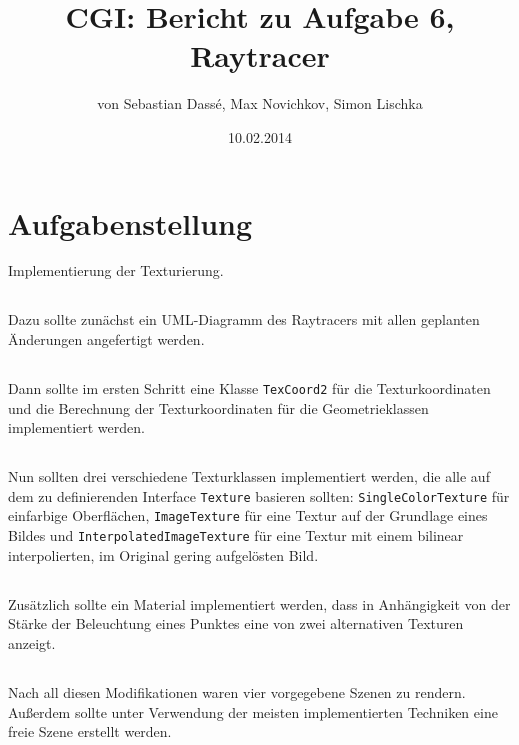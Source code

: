 \documentclass[11pt]{amsart}
\title{CGI: Bericht zu Aufgabe 6, Raytracer}
\author{von Sebastian Dass\'{e}, Max Novichkov, Simon Lischka }
\date{10.02.2014}
\begin{document}
\maketitle

\section{Aufgabenstellung}
Implementierung der Texturierung.

\subsection{}
Dazu sollte zun\"achst ein UML-Diagramm des Raytracers mit allen geplanten \"Anderungen angefertigt werden.

\subsection{}
Dann sollte im ersten Schritt eine Klasse \texttt{TexCoord2} f\"ur die Texturkoordinaten  und die Berechnung der 
Texturkoordinaten f\"ur die Geometrieklassen implementiert werden.

\subsection{}
Nun sollten drei verschiedene Texturklassen implementiert werden, die alle auf dem zu definierenden Interface 
\texttt{Texture} basieren sollten: \texttt{SingleColorTexture} f\"ur einfarbige Oberfl\"achen, \texttt{ImageTexture} 
f\"ur eine Textur auf der Grundlage eines Bildes und \texttt{InterpolatedImageTexture} f\"ur eine Textur mit einem 
bilinear interpolierten, im Original gering aufgel\"osten Bild.

\subsection{}
Zus\"atzlich sollte ein Material implementiert werden, dass in Anh\"angigkeit von der St\"arke der Beleuchtung eines 
Punktes eine von zwei alternativen Texturen anzeigt.

\subsection{}
Nach all diesen Modifikationen waren vier vorgegebene Szenen zu rendern. Au\ss{}erdem sollte unter Verwendung der 
meisten implementierten Techniken eine freie Szene erstellt werden.
\end{document}
